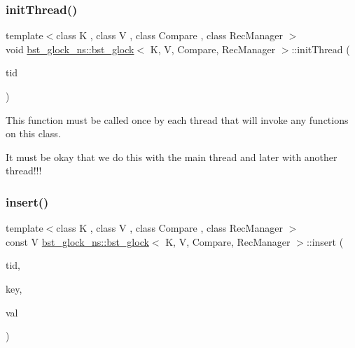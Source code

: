 \mbox{\label{classbst__glock__ns_1_1bst__glock_a379957b4de80cfcdf1f50eb74bda9601}} 
\subsubsection{\texorpdfstring{init\+Thread()}{initThread()}}
{\footnotesize\ttfamily template$<$class K , class V , class Compare , class Rec\+Manager $>$ \\
void \hyperlink{classbst__glock__ns_1_1bst__glock}{bst\+\_\+glock\+\_\+ns\+::bst\+\_\+glock}$<$ K, V, Compare, Rec\+Manager $>$\+::init\+Thread (\begin{DoxyParamCaption}\item[{const int}]{tid }\end{DoxyParamCaption})\hspace{0.3cm}{\ttfamily [inline]}}

This function must be called once by each thread that will invoke any functions on this class.

It must be okay that we do this with the main thread and later with another thread!!! \mbox{\label{classbst__glock__ns_1_1bst__glock_ac5304fe4db2baa083ad2d9316ae56adf}} 
\subsubsection{\texorpdfstring{insert()}{insert()}}
{\footnotesize\ttfamily template$<$class K , class V , class Compare , class Rec\+Manager $>$ \\
const V \hyperlink{classbst__glock__ns_1_1bst__glock}{bst\+\_\+glock\+\_\+ns\+::bst\+\_\+glock}$<$ K, V, Compare, Rec\+Manager $>$\+::insert (\begin{DoxyParamCaption}\item[{const int}]{tid,  }\item[{const K \&}]{key,  }\item[{const V \&}]{val }\end{DoxyParamCaption})\hspace{0.3cm}{\ttfamily [inline]}}

